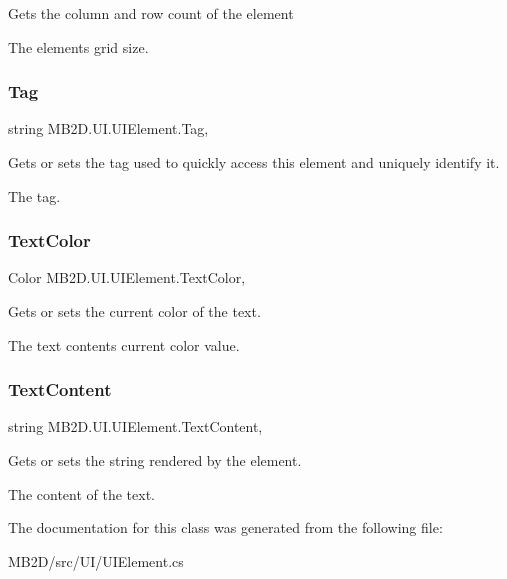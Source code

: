 Gets the column and row count of the element 

The elements grid size.\hypertarget{class_m_b2_d_1_1_u_i_1_1_u_i_element_a6cb084698047528460e9c56690307f2c}{}\label{class_m_b2_d_1_1_u_i_1_1_u_i_element_a6cb084698047528460e9c56690307f2c} 
\subsubsection{\texorpdfstring{Tag}{Tag}}
{\footnotesize\ttfamily string M\+B2\+D.\+U\+I.\+U\+I\+Element.\+Tag\hspace{0.3cm}{\ttfamily [get]}, {\ttfamily [set]}}



Gets or sets the tag used to quickly access this element and uniquely identify it. 

The tag.\hypertarget{class_m_b2_d_1_1_u_i_1_1_u_i_element_aaf5bdcd4524ae5e93f1c40431d7d6c90}{}\label{class_m_b2_d_1_1_u_i_1_1_u_i_element_aaf5bdcd4524ae5e93f1c40431d7d6c90} 
\subsubsection{\texorpdfstring{Text\+Color}{TextColor}}
{\footnotesize\ttfamily Color M\+B2\+D.\+U\+I.\+U\+I\+Element.\+Text\+Color\hspace{0.3cm}{\ttfamily [get]}, {\ttfamily [set]}}



Gets or sets the current color of the text. 

The text contents current color value.\hypertarget{class_m_b2_d_1_1_u_i_1_1_u_i_element_abddab0c939c89a0be403b577d4428309}{}\label{class_m_b2_d_1_1_u_i_1_1_u_i_element_abddab0c939c89a0be403b577d4428309} 
\subsubsection{\texorpdfstring{Text\+Content}{TextContent}}
{\footnotesize\ttfamily string M\+B2\+D.\+U\+I.\+U\+I\+Element.\+Text\+Content\hspace{0.3cm}{\ttfamily [get]}, {\ttfamily [set]}}



Gets or sets the string rendered by the element. 

The content of the text.

The documentation for this class was generated from the following file\+:\begin{DoxyCompactItemize}
\item 
M\+B2\+D/src/\+U\+I/U\+I\+Element.\+cs\end{DoxyCompactItemize}
